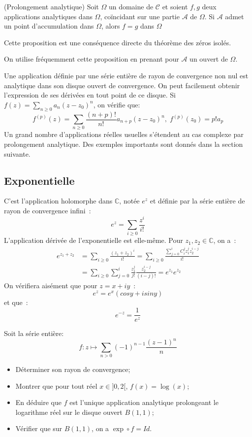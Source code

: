\begin{fprop}(Prolongement analytique)
Soit $\Omega$ un domaine de $\mathcal{C}$ et soient $f,g$ deux applications
analytiques dans $\Omega$, coïncidant sur une partie $\mathcal{A}$ de $\Omega$.
Si $\mathcal{A}$ admet un point d'accumulation dans $\Omega$, alors $f=g$ dans
$\Omega$
\end{fprop}

Cette proposition est une conséquence directe du théorème des zéros isolés. 
\begin{rem}
On utilise fréquemment cette proposition en prenant pour $\mathcal{A}$ un ouvert
de $\Omega$.
\end{rem}
Une application définie par une série entière de rayon de convergence non nul
est analytique dans son disque ouvert de convergence. On peut facilement obtenir
l'expression de ses dérivées en tout point de ce disque. Si $f(z) = \sum_{n
\geq 0} a_n (z-z_0)^n$, on vérifie que:
\[
f^{(p)}(z) = \sum_{n \geq 0}\frac{(n+p)!}{n!}a_{n+p}(z-z_0)^n,\;
f^{(p)}(z_0)=p!a_p
\]
 Un grand nombre d'applications réelles usuelles s'étendent au cas complexe par
 prolongement analytique. Des exemples importants sont donnés dans la section
 suivante.
\subsection{Exponentielle}
C'est l'application holomorphe dans $\mathbb{C}$, notée $e^z$ et
définie par la série entière de rayon de convergence infini~:
\[
e^z = \sum_{i \geq 0} \frac{z^i}{i!}
\]
L'application dérivée de l'exponentielle est elle-même. 
Pour $z_1,z_2 \in \mathbb{C}$, on a~:
\begin{align*}
e^{z_1+z_2} & = \sum_{i \geq 0} \frac{(z_1+z_2)^i}{i!} = 
\sum_{i \geq 0} \frac{\sum_{j=0}^i C_i^j z_1^j z_2^{i-j}}{i!} \\
& = \sum_{i \geq 0} \sum_{j=0}^i \frac{z_1^j}{j!}
\frac{z_2^{i-j}}{(i-j)!} = e^{z_1} e^{z_2}
\end{align*}
On vérifiera aisément que pour $z = x + iy$~:
\[
e^z = e^x (cos y + i sin y)
\]
et que~:
\[
e^{-z} = \frac{1}{e^z}
\]
\begin{exercice}
Soit la série entière:
\[
f \colon z \mapsto \sum_{n >0}(-1)^{n-1}\frac{(z-1)^n}{n}
\]
\begin{itemize}
  \item Déterminer son rayon de convergence;
  \item Montrer que pour tout réel $x \in ]0,2[$, $f(x)=\log(x)$;
  \item En déduire que $f$ est l'unique application analytique prolongeant le
  logarithme réel sur le disque ouvert $B(1,1)$;
  \item Vérifier que sur $B(1,1)$, on a $\exp \circ f = Id$.
\end{itemize}
\end{exercice}

